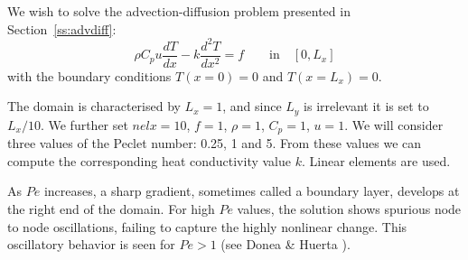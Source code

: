 
We wish to solve the advection-diffusion problem presented in 
Section~\ref{ss:advdiff}:
\begin{equation}
\rho C_p u \frac{dT}{dx} - k \frac{d^2T}{dx^2} = f \qquad \text{in} \quad [0,L_x]
\end{equation}
with the boundary conditions $T(x=0)=0$ and $T(x=L_x)=0$.

The domain is characterised by $L_x=1$, and since $L_y$ is irrelevant it is set to $L_x/10$.
We further set $nelx=10$, $f=1$, $\rho=1$, $C_p=1$, $u=1$.
We will consider three values of the Peclet number: 0.25, 1 and 5.
From these values we can compute the corresponding heat conductivity value $k$.
Linear elements are used.

As $Pe$ increases, a sharp gradient, sometimes called a boundary layer,
develops at the right end of the domain. For high $Pe$ values, the solution shows 
spurious node to node oscillations, failing to capture the highly nonlinear change. This oscillatory
behavior is seen for $Pe>1$ (see Donea \& Huerta \cite{dohu03}).

